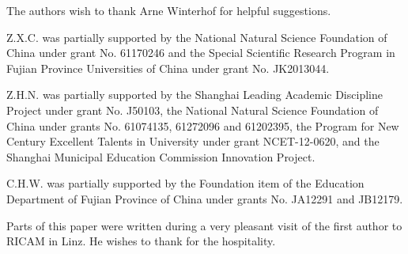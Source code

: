 \documentclass [11pt,a4paper]{article}
\begin{document}
The authors wish  to thank Arne Winterhof for helpful suggestions.




Z.X.C. was partially supported by the National Natural Science
Foundation of China under grant No. 61170246 and the Special Scientific Research Program in Fujian Province Universities of China under grant No. JK2013044.

Z.H.N. was partially supported by the Shanghai Leading Academic Discipline Project under grant No. J50103,
the National Natural Science Foundation of China  under grants No. 61074135, 61272096 and 61202395, the Program for New Century Excellent Talents in University  under grant NCET-12-0620, and the Shanghai Municipal Education Commission Innovation Project.

C.H.W. was partially supported by the Foundation item of the Education Department of Fujian Province of China under grants No. JA12291 and JB12179.

Parts of this paper were written during a very pleasant visit of the
first author to RICAM in Linz. He wishes to thank for the hospitality.
\end{document}
